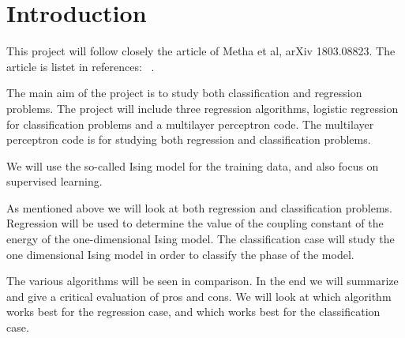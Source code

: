 \section{Introduction}
This project will follow closely the article of Metha et al, arXiv 1803.08823. 
The article is listet in references: ~\cite{HighBias}.

The main aim of the project is to study both classification and regression 
problems. The project will include three regression algorithms, 
logistic regression for classification problems and a multilayer 
perceptron code. The multilayer perceptron code is for studying both regression
and classification problems.

We will use the so-called Ising model for the training data, and also 
focus on supervised learning. 

As mentioned above we will look at both regression and classification problems.
Regression will be used to determine the value of the coupling constant
of the energy of the one-dimensional Ising model. 
The classification case will study the one dimensional Ising model in order to
classify the phase of the model. 

The various algorithms will be seen in comparison. In the end we will
summarize and give a critical evaluation of pros and cons. 
We will look at which algorithm works best for the regression case, 
and which works best for the classification case.~\cite{Project2} 
